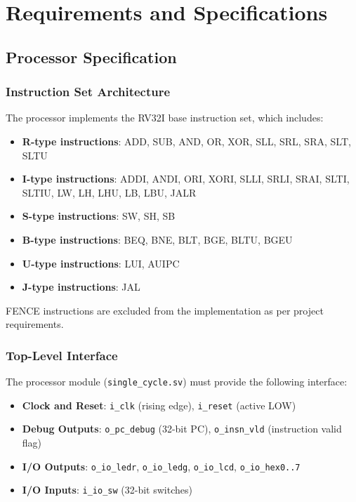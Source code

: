 \chapter{Requirements and Specifications}

\section{Processor Specification}

\subsection{Instruction Set Architecture}

The processor implements the RV32I base instruction set, which includes:

\begin{itemize}
    \item \textbf{R-type instructions}: ADD, SUB, AND, OR, XOR, SLL, SRL, SRA, SLT, SLTU
    \item \textbf{I-type instructions}: ADDI, ANDI, ORI, XORI, SLLI, SRLI, SRAI, SLTI, SLTIU, LW, LH, LHU, LB, LBU, JALR
    \item \textbf{S-type instructions}: SW, SH, SB
    \item \textbf{B-type instructions}: BEQ, BNE, BLT, BGE, BLTU, BGEU
    \item \textbf{U-type instructions}: LUI, AUIPC
    \item \textbf{J-type instructions}: JAL
\end{itemize}

FENCE instructions are excluded from the implementation as per project requirements.

\subsection{Top-Level Interface}

The processor module (\texttt{single\_cycle.sv}) must provide the following interface:

\begin{itemize}
    \item \textbf{Clock and Reset}: \texttt{i\_clk} (rising edge), \texttt{i\_reset} (active LOW)
    \item \textbf{Debug Outputs}: \texttt{o\_pc\_debug} (32-bit PC), \texttt{o\_insn\_vld} (instruction valid flag)
    \item \textbf{I/O Outputs}: \texttt{o\_io\_ledr}, \texttt{o\_io\_ledg}, \texttt{o\_io\_lcd}, \texttt{o\_io\_hex0..7}
    \item \textbf{I/O Inputs}: \texttt{i\_io\_sw} (32-bit switches)
\end{itemize}

